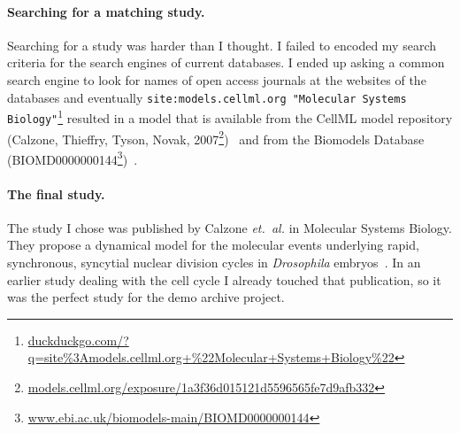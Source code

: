 \paragraph{Searching for a matching study.}
Searching for a study was harder than I thought.
I failed to encoded my search criteria for the search engines of current databases.
I ended up asking a common search engine to look for names of open access journals at the websites of the databases and eventually \texttt{site:models.cellml.org "Molecular Systems Biology"}\footnote{\href{https://duckduckgo.com/?q=site\%3Amodels.cellml.org+\%22Molecular+Systems+Biology\%22}{duckduckgo.com/?q=site\%3Amodels.cellml.org+\%22Molecular+Systems+Biology\%22}} resulted in a model that is available from the CellML model repository (Calzone, Thieffry, Tyson, Novak, 2007\footnote{\href{http://models.cellml.org/exposure/1a3f36d015121d5596565fe7d9afb332}{models.cellml.org/exposure/1a3f36d015121d5596565fe7d9afb332}})~\cite{cellmlrepo} and from the Biomodels Database (BIOMD0000000144\footnote{\href{http://www.ebi.ac.uk/biomodels-main/BIOMD0000000144}{www.ebi.ac.uk/biomodels-main/BIOMD0000000144}})~\cite{biomodels}.


\paragraph{The final study.}
The study I chose was published by Calzone \emph{et.~al.} in Molecular Systems Biology. They propose a dynamical model for the molecular events underlying rapid, synchronous, syncytial nuclear division cycles in \textit{Drosophila} embryos~\cite{Calzone2007}.
In an earlier study dealing with the cell cycle I already touched that publication, so it was the perfect study for the demo archive project.




